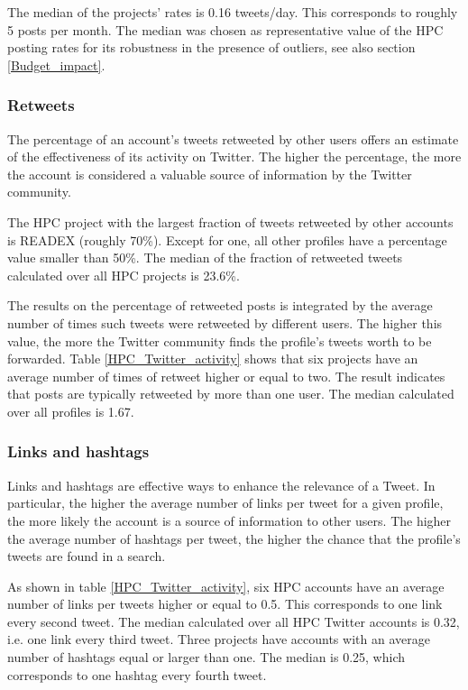 The median of the projects' rates is 0.16 tweets/day. This corresponds to roughly 5 posts per month. The median was chosen as representative value of the HPC posting rates for its robustness in the presence of outliers, see also section \ref{Budget_impact}.

\subsubsection{Retweets}
The percentage of an account's tweets retweeted by other users offers an estimate of the effectiveness of its activity on Twitter. The higher the percentage, the more the account is considered a valuable source of information by the Twitter community. 

The HPC project with the largest fraction of tweets retweeted by other accounts is READEX (roughly 70\%). Except for one, all other profiles have a percentage value smaller than 50\%. The median of the fraction of retweeted tweets calculated over all HPC projects is 23.6\%.

The results on the percentage of retweeted posts is integrated by the average number of times such tweets were retweeted by different users. The higher this value, the more the Twitter community finds the profile's tweets worth to be forwarded. Table \ref{HPC_Twitter_activity} shows that six projects have an average number of times of retweet higher or equal to two. The result indicates that posts are typically retweeted by more than one user. The median calculated over all profiles is 1.67.

\subsubsection{Links and hashtags}
Links and hashtags are effective ways to enhance the relevance of a Tweet. In particular, the higher the average number of links per tweet for a given profile, the more likely the account is a source of information to other users. The higher the average number of hashtags per tweet, the higher the chance that the profile's tweets are found in a search.

As shown in table \ref{HPC_Twitter_activity}, six HPC accounts have an average number of links per tweets higher or equal to 0.5. This corresponds to one link every second tweet. The median calculated over all HPC Twitter accounts is 0.32, i.e. one link every third tweet. Three projects have accounts with an average number of hashtags equal or larger than one. The median is 0.25, which corresponds to one hashtag every fourth tweet.

